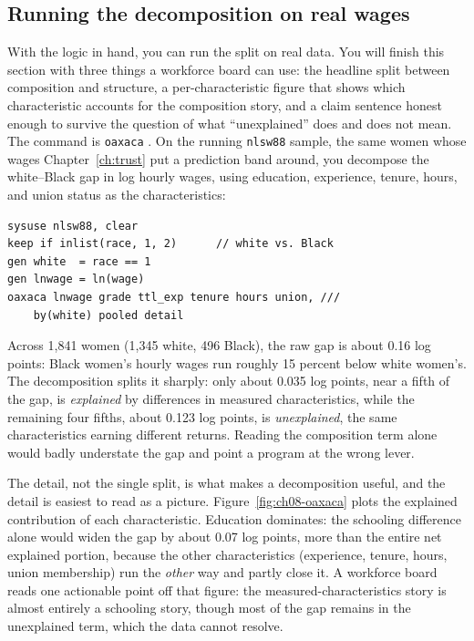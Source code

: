 \subsection{Running the decomposition on real wages}\label{sec:oaxaca-run}
With the logic in hand, you can run the split on real data. You will finish this section with three things a workforce board can use: the headline split between composition and structure, a per-characteristic figure that shows which characteristic accounts for the composition story, and a claim sentence honest enough to survive the question of what \enquote{unexplained} does and does not mean. The command is \texttt{oaxaca} \parencite{jann2008oaxaca}. On the running \texttt{nlsw88} sample, the same women whose wages Chapter~\ref{ch:trust} put a prediction band around, you decompose the white--Black gap in log hourly wages, using education, experience, tenure, hours, and union status as the characteristics:
\par
{\footnotesize
\begin{verbatim}
sysuse nlsw88, clear
keep if inlist(race, 1, 2)      // white vs. Black
gen white  = race == 1
gen lnwage = ln(wage)
oaxaca lnwage grade ttl_exp tenure hours union, ///
    by(white) pooled detail
\end{verbatim}
}
Across 1{,}841 women (1{,}345 white, 496 Black), the raw gap is about 0.16 log points: Black women's hourly wages run roughly 15 percent below white women's. The decomposition splits it sharply: only about 0.035 log points, near a fifth of the gap, is \emph{explained} by differences in measured characteristics, while the remaining four fifths, about 0.123 log points, is \emph{unexplained}, the same characteristics earning different returns. Reading the composition term alone would badly understate the gap and point a program at the wrong lever.

The detail, not the single split, is what makes a decomposition useful, and the detail is easiest to read as a picture. Figure~\ref{fig:ch08-oaxaca} plots the explained contribution of each characteristic. Education dominates: the schooling difference alone would widen the gap by about 0.07 log points, more than the entire net explained portion, because the other characteristics (experience, tenure, hours, union membership) run the \emph{other} way and partly close it. A workforce board reads one actionable point off that figure: the measured-characteristics story is almost entirely a schooling story, though most of the gap remains in the unexplained term, which the data cannot resolve.

